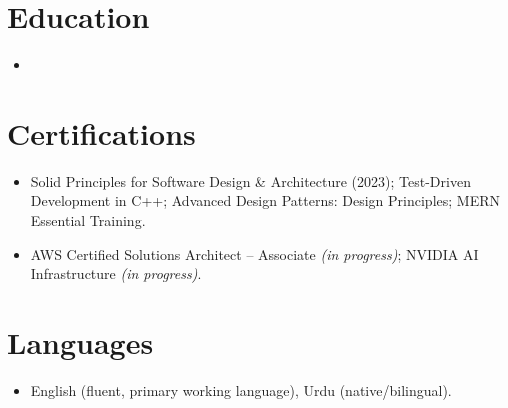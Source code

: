 \documentclass[11pt,a4paper,sans]{moderncv}
\begin{document}

\section{Education}
\vspace{1pt}
\begin{itemize}

\item{}

\end{itemize}


\section{Certifications}
\vspace{1pt}
\begin{itemize}
\item {Solid Principles for Software Design \& Architecture (2023); Test-Driven Development in C++; Advanced Design Patterns: Design Principles; MERN Essential Training.}
\item {AWS Certified Solutions Architect -- Associate \emph{(in progress)}; NVIDIA AI Infrastructure \emph{(in progress)}.}
\end{itemize}


\section{Languages}
\vspace{1pt}
\begin{itemize}
\item {English (fluent, primary working language), Urdu (native/bilingual).}
\end{itemize}
\end{document}
